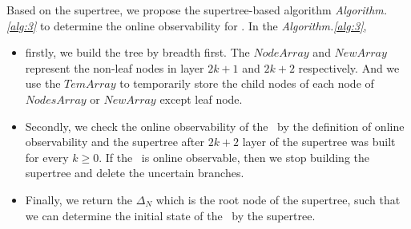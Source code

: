 Based on the supertree, we propose the supertree-based algorithm {\em Algorithm.\ref{alg:3}} to determine the online observability for \BCNs. In the {\em Algorithm.\ref{alg:3}},
\begin{itemize}
\item firstly, we build the tree by breadth first. The $NodeArray$ and $NewArray$ represent the non-leaf nodes in layer $2k+1$ and $2k+2$ respectively. And we use the $TemArray$ to temporarily store the child nodes of each node of $NodesArray$ or $NewArray$ except leaf node.%
\item Secondly, we check the online observability of the \BCN\ by the definition of online observability and the supertree after $2k+2$ layer of the supertree was built for every $k\ge0$. If the \BCN\ is online observable, then we stop building the supertree and delete the uncertain branches. 
\item Finally, we return the $\Delta_N$ which is the root node of the supertree, such that we can determine the initial state of the \BCN\ by the supertree.
 \end{itemize}
